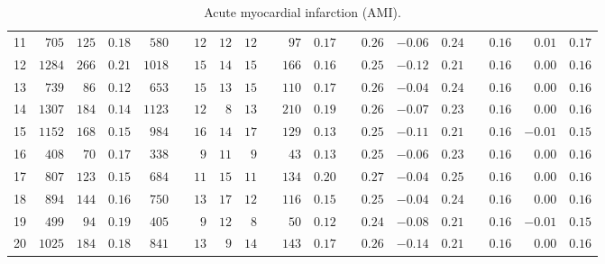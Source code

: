 \documentclass[]{article}\usepackage[]{graphicx}\usepackage[]{color}
\begin{document}
\begin{landscape}
\begin{table}[!tbp]
\begin{center}
\begin{tabular}{lrrrrcrrrcrrcrrrcrrr}
11&$ 705$&$125$&$0.18$&$ 580$&&$12$&$12$&$12$&&$ 97$&$0.17$&&$0.26$&$-0.06$&$0.24$&&$0.16$&$ 0.01$&$0.17$\tabularnewline
12&$1284$&$266$&$0.21$&$1018$&&$15$&$14$&$15$&&$166$&$0.16$&&$0.25$&$-0.12$&$0.21$&&$0.16$&$ 0.00$&$0.16$\tabularnewline
13&$ 739$&$ 86$&$0.12$&$ 653$&&$15$&$13$&$15$&&$110$&$0.17$&&$0.26$&$-0.04$&$0.24$&&$0.16$&$ 0.00$&$0.16$\tabularnewline
14&$1307$&$184$&$0.14$&$1123$&&$12$&$ 8$&$13$&&$210$&$0.19$&&$0.26$&$-0.07$&$0.23$&&$0.16$&$ 0.00$&$0.16$\tabularnewline
15&$1152$&$168$&$0.15$&$ 984$&&$16$&$14$&$17$&&$129$&$0.13$&&$0.25$&$-0.11$&$0.21$&&$0.16$&$-0.01$&$0.15$\tabularnewline
16&$ 408$&$ 70$&$0.17$&$ 338$&&$ 9$&$11$&$ 9$&&$ 43$&$0.13$&&$0.25$&$-0.06$&$0.23$&&$0.16$&$ 0.00$&$0.16$\tabularnewline
17&$ 807$&$123$&$0.15$&$ 684$&&$11$&$15$&$11$&&$134$&$0.20$&&$0.27$&$-0.04$&$0.25$&&$0.16$&$ 0.00$&$0.16$\tabularnewline
18&$ 894$&$144$&$0.16$&$ 750$&&$13$&$17$&$12$&&$116$&$0.15$&&$0.25$&$-0.04$&$0.24$&&$0.16$&$ 0.00$&$0.16$\tabularnewline
19&$ 499$&$ 94$&$0.19$&$ 405$&&$ 9$&$12$&$ 8$&&$ 50$&$0.12$&&$0.24$&$-0.08$&$0.21$&&$0.16$&$-0.01$&$0.15$\tabularnewline
20&$1025$&$184$&$0.18$&$ 841$&&$13$&$ 9$&$14$&&$143$&$0.17$&&$0.26$&$-0.14$&$0.21$&&$0.16$&$ 0.00$&$0.16$\tabularnewline
\hline
\end{tabular}

\caption{Acute myocardial infarction (AMI).\label{round}}\end{center}

\end{table}




\end{landscape}
\end{document}
